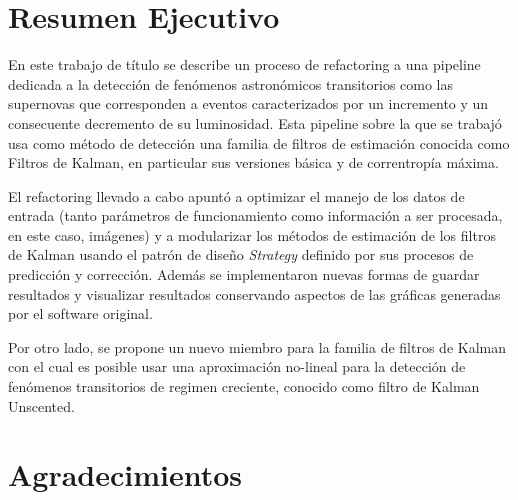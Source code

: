 \begin{preface}
\section{Resumen Ejecutivo}
En este trabajo de t\'itulo se describe un proceso de refactoring a una pipeline dedicada a la detecci\'on de fen\'omenos astron\'omicos transitorios como las supernovas que corresponden a eventos caracterizados por un incremento y un consecuente decremento de su luminosidad. Esta pipeline sobre la que se trabaj\'o usa como m\'etodo de detecci\'on una familia de filtros de estimaci\'on conocida como Filtros de Kalman, en particular sus versiones b\'asica y de correntrop\'ia m\'axima.
\bigskip

El refactoring llevado a cabo apunt\'o a optimizar el manejo de los datos de entrada (tanto par\'ametros de funcionamiento como informaci\'on a ser procesada, en este caso, im\'agenes) y a modularizar los m\'etodos de estimaci\'on de los filtros de Kalman usando el patr\'on de dise\~no \textit{Strategy} definido por sus procesos de predicci\'on y correcci\'on. Adem\'as se  implementaron nuevas formas de guardar resultados y visualizar resultados conservando aspectos de las gr\'aficas generadas por el software original. 
\bigskip

Por otro lado, se propone un nuevo miembro para la familia de filtros de Kalman con el cual es posible usar una aproximaci\'on no-lineal para la detecci\'on de fen\'omenos transitorios de regimen creciente, conocido como filtro de Kalman Unscented.




\section{Agradecimientos}

\begin{flushright}
\makeatletter
	\@author
\makeatother
\end{flushright}

\tableofcontents

\listoftables

\listoffigures

\end{preface}